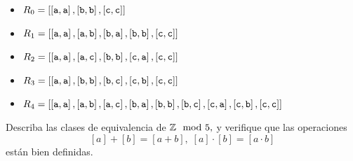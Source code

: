 	\begin{itemize}
		\item $\displaystyle R_{0}= \left[\left[\text{\texttt{a}}, \text{\texttt{a}}\right], \left[\text{\texttt{b}}, \text{\texttt{b}}\right], \left[\text{\texttt{c}}, \text{\texttt{c}}\right]\right] $
		\item $\displaystyle R_{1}= \left[\left[\text{\texttt{a}}, \text{\texttt{a}}\right], \left[\text{\texttt{a}}, \text{\texttt{b}}\right], \left[\text{\texttt{b}}, \text{\texttt{a}}\right], \left[\text{\texttt{b}}, \text{\texttt{b}}\right], \left[\text{\texttt{c}}, \text{\texttt{c}}\right]\right] $
		\item $\displaystyle R_{2}= \left[\left[\text{\texttt{a}}, \text{\texttt{a}}\right], \left[\text{\texttt{a}}, \text{\texttt{c}}\right], \left[\text{\texttt{b}}, \text{\texttt{b}}\right], \left[\text{\texttt{c}}, \text{\texttt{a}}\right], \left[\text{\texttt{c}}, \text{\texttt{c}}\right]\right] $
		\item $\displaystyle R_{3}= \left[\left[\text{\texttt{a}}, \text{\texttt{a}}\right], \left[\text{\texttt{b}}, \text{\texttt{b}}\right], \left[\text{\texttt{b}}, \text{\texttt{c}}\right], \left[\text{\texttt{c}}, \text{\texttt{b}}\right], \left[\text{\texttt{c}}, \text{\texttt{c}}\right]\right] $
		\item $\displaystyle R_{4}= \left[\left[\text{\texttt{a}}, \text{\texttt{a}}\right], \left[\text{\texttt{a}}, \text{\texttt{b}}\right], \left[\text{\texttt{a}}, \text{\texttt{c}}\right], \left[\text{\texttt{b}}, \text{\texttt{a}}\right], \left[\text{\texttt{b}}, \text{\texttt{b}}\right], \left[\text{\texttt{b}}, \text{\texttt{c}}\right], \left[\text{\texttt{c}}, \text{\texttt{a}}\right], \left[\text{\texttt{c}}, \text{\texttt{b}}\right], \left[\text{\texttt{c}}, \text{\texttt{c}}\right]\right] $
		
	\end{itemize}
	




\begin{problema}
\label{lip:exmp:2.13.b}
Describa las clases de equivalencia de $\mathbb{Z} \mod 5,$ y verifique que las operaciones
$$
[a]+[b]=[a+b], \; [a]\cdot[b]=[a \cdot b]
$$ están bien definidas.   
\end{problema}





